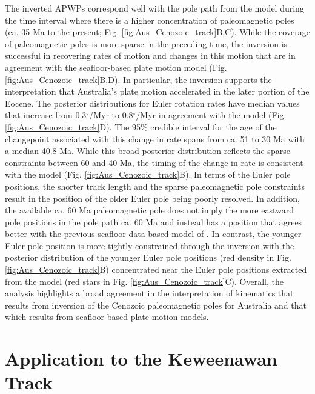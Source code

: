 \documentclass[11pt,letterpaper]{article}
\begin{document}
The inverted APWPs correspond well with the pole path from the \cite{Muller2016a} model during the time interval where there is a higher concentration of paleomagnetic poles (ca. 35 Ma to the present; Fig. \ref{fig:Aus_Cenozoic_track}B,C). While the coverage of paleomagnetic poles is more sparse in the preceding time, the inversion is successful in recovering rates of motion and changes in this motion that are in agreement with the seafloor-based plate motion model (Fig. \ref{fig:Aus_Cenozoic_track}B,D). In particular, the inversion supports the interpretation that Australia's plate motion accelerated in the later portion of the Eocene. The posterior distributions for Euler rotation rates have median values that increase from 0.3$^\circ$/Myr to 0.8$^\circ$/Myr in agreement with the \cite{Muller2016a} model (Fig. \ref{fig:Aus_Cenozoic_track}D). The 95\% credible interval for the age of the changepoint associated with this change in rate spans from ca. 51 to 30 Ma with a median 40.8 Ma. While this broad posterior distribution reflects the sparse constraints between 60 and 40 Ma, the timing of the change in rate is consistent with the \cite{Muller2016a} model (Fig. \ref{fig:Aus_Cenozoic_track}B). In terms of the Euler pole positions, the shorter track length and the sparse paleomagnetic pole constraints result in the position of the older Euler pole being poorly resolved. In addition, the available ca. 60 Ma paleomagnetic pole does not imply the more eastward pole positions in the pole path ca. 60 Ma and instead has a position that agrees better with the previous seafloor data based model of \cite{Seton2012a}. In contrast, the younger Euler pole position is more tightly constrained through the inversion with the posterior distribution of the younger Euler pole positions (red density in Fig. \ref{fig:Aus_Cenozoic_track}B) concentrated near the Euler pole positions extracted from the \cite{Muller2016a} model (red stars in Fig. \ref{fig:Aus_Cenozoic_track}C). Overall, the analysis highlights a broad agreement in the interpretation of kinematics that results from inversion of the Cenozoic paleomagnetic poles for Australia and that which results from seafloor-based plate motion models. 

\section*{Application to the Keweenawan Track}
\label{sec:keweenawan}
\end{document}
